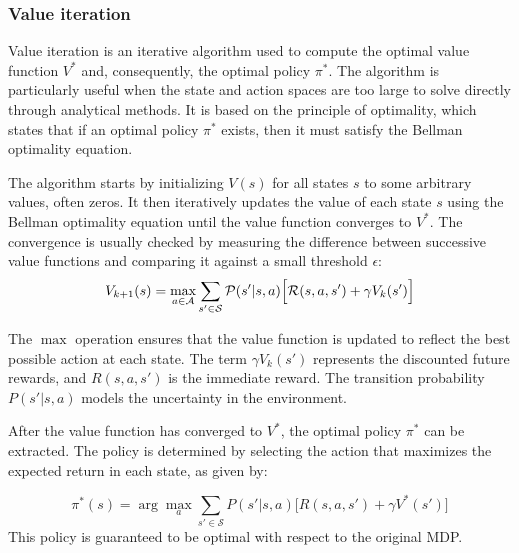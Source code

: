 \subsubsection{Value iteration}
Value iteration is an iterative algorithm used to compute the optimal value function \(V^*\) and, consequently, the optimal policy \(\pi^*\). 
 The algorithm is particularly useful when the state and action spaces are too large to solve directly through analytical methods. 
 It is based on the principle of optimality, which states that if an optimal policy \(\pi^*\) exists, then it must satisfy the Bellman optimality equation.

The algorithm starts by initializing \(V(s)\) for all states \(s\) to some arbitrary values, often zeros. 
 It then iteratively updates the value of each state \(s\) using the Bellman optimality equation until the value function converges to \(V^*\). 
 The convergence is usually checked by measuring the difference between successive value functions and comparing it against a small threshold \(\epsilon\):
\begin{equation}
V_{k+1}(s) = \max_{a \in \mathcal{A}} \sum_{s' \in \mathcal{S}} \mathcal{P}(s'|s, a) \Big[ \mathcal{R}(s, a, s') + \gamma V_k(s') \Big]
\end{equation}

The \(\max\) operation ensures that the value function is updated to reflect the best possible action at each state. 
 The term \(\gamma V_k(s')\) represents the discounted future rewards, and \(R(s, a, s')\) is the immediate reward. 
 The transition probability \(P(s'|s, a)\) models the uncertainty in the environment.

After the value function has converged to \(V^*\), the optimal policy \(\pi^*\) can be extracted. The policy is determined by selecting the action that maximizes the expected return in each state, as given by:

\begin{equation}
\pi^*(s) = \arg \max_{a} \sum_{s' \in \mathcal{S}} P(s'|s, a) \Big[ R(s, a, s') + \gamma V^*(s') \Big]
\end{equation}
This policy is guaranteed to be optimal with respect to the original MDP.

